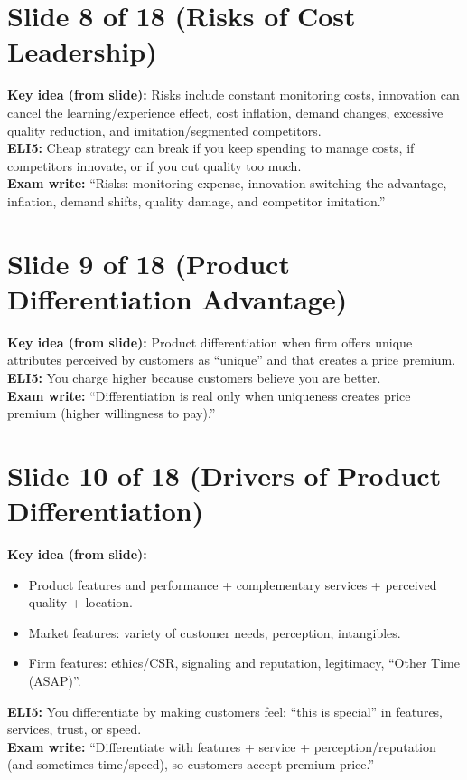 \documentclass[11pt,a4paper]{article}
\begin{document}
\section*{Slide 8 of 18 (Risks of Cost Leadership)}
\textbf{Key idea (from slide):} Risks include constant monitoring costs, innovation can cancel the learning/experience effect, cost inflation, demand changes, excessive quality reduction, and imitation/segmented competitors.\\
\textbf{ELI5:} Cheap strategy can break if you keep spending to manage costs, if competitors innovate, or if you cut quality too much.\\
\textbf{Exam write:} ``Risks: monitoring expense, innovation switching the advantage, inflation, demand shifts, quality damage, and competitor imitation.''

\section*{Slide 9 of 18 (Product Differentiation Advantage)}
\textbf{Key idea (from slide):} Product differentiation when firm offers unique attributes perceived by customers as ``unique'' and that creates a price premium.\\
\textbf{ELI5:} You charge higher because customers believe you are better.\\
\textbf{Exam write:} ``Differentiation is real only when uniqueness creates price premium (higher willingness to pay).''

\section*{Slide 10 of 18 (Drivers of Product Differentiation)}
\textbf{Key idea (from slide):}
\begin{itemize}
  \item Product features and performance + complementary services + perceived quality + location.
  \item Market features: variety of customer needs, perception, intangibles.
  \item Firm features: ethics/CSR, signaling and reputation, legitimacy, ``Other Time (ASAP)''.
\end{itemize}
\textbf{ELI5:} You differentiate by making customers feel: ``this is special'' in features, services, trust, or speed.\\
\textbf{Exam write:} ``Differentiate with features + service + perception/reputation (and sometimes time/speed), so customers accept premium price.''
\end{document}
